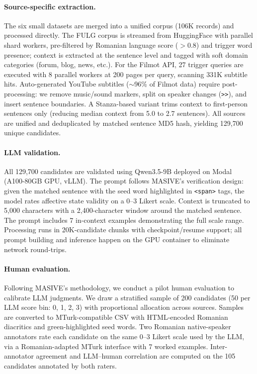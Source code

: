 \documentclass[11pt]{article}
\begin{document}
\paragraph{Source-specific extraction.} The six small datasets are merged into a unified corpus (106K records) and processed directly. The FULG corpus is streamed from HuggingFace with parallel shard workers, pre-filtered by Romanian language score ($>$0.8) and trigger word presence; context is extracted at the sentence level and tagged with soft domain categories (forum, blog, news, etc.). For the Filmot API, 27 trigger queries are executed with 8 parallel workers at 200 pages per query, scanning 331K subtitle hits. Auto-generated YouTube subtitles ($\sim$96\% of Filmot data) require post-processing: we remove music/sound markers, split on speaker changes (\texttt{>>}), and insert sentence boundaries. A Stanza-based variant trims context to first-person sentences only (reducing median context from 5.0 to 2.7 sentences). All sources are unified and deduplicated by matched sentence MD5 hash, yielding 129,700 unique candidates.

\paragraph{LLM validation.} All 129,700 candidates are validated using Qwen3.5-9B deployed on Modal (A100-80GB GPU, vLLM). The prompt follows MASIVE's verification design: given the matched sentence with the seed word highlighted in \texttt{<span>} tags, the model rates affective state validity on a 0--3 Likert scale. Context is truncated to 5,000 characters with a 2,400-character window around the matched sentence. The prompt includes 7 in-context examples demonstrating the full scale range. Processing runs in 20K-candidate chunks with checkpoint/resume support; all prompt building and inference happen on the GPU container to eliminate network round-trips.

\paragraph{Human evaluation.} Following MASIVE's methodology, we conduct a pilot human evaluation to calibrate LLM judgments. We draw a stratified sample of 200 candidates (50 per LLM score bin: 0, 1, 2, 3) with proportional allocation across sources. Samples are converted to MTurk-compatible CSV with HTML-encoded Romanian diacritics and green-highlighted seed words. Two Romanian native-speaker annotators rate each candidate on the same 0--3 Likert scale used by the LLM, via a Romanian-adapted MTurk interface with 7 worked examples. Inter-annotator agreement and LLM--human correlation are computed on the 105 candidates annotated by both raters.
\end{document}
